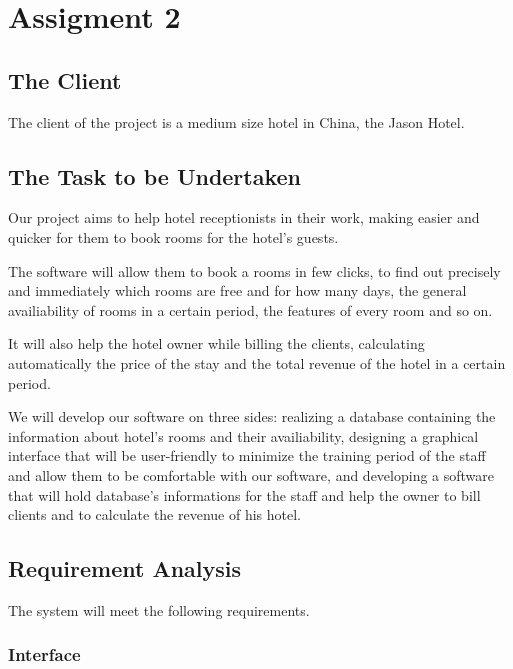 
\section{Assigment 2}

\subsection{The Client}
The client of the project is a medium size hotel in China, the Jason Hotel.

\subsection{The Task to be Undertaken}
Our project aims to help hotel receptionists in their work, making easier and quicker for them to book rooms for the hotel's guests. 

The software will allow them to book a rooms in few clicks, to find out precisely and immediately which rooms are free and for how many days, the general availiability of rooms in a certain period, the features of every room and so on. 

It will also help the hotel owner while billing the clients, calculating automatically the price of the stay and the total revenue of the hotel in a certain period.

We will develop our software on three sides: realizing a database containing the information about hotel's rooms and their availiability, designing a graphical interface that will be user-friendly to minimize the training period of the staff and allow them to be comfortable with our software, and developing a software that will hold database's informations for the staff and help the owner to bill clients and to calculate the revenue of his hotel.

\subsection{Requirement Analysis}

The system will meet the following requirements.

\subsubsection{Interface}

